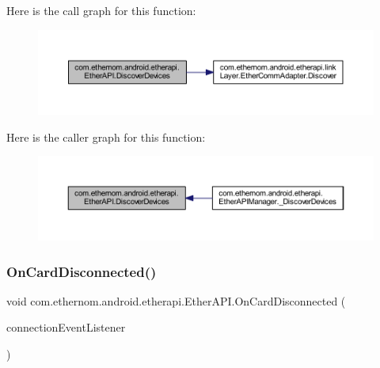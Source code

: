 Here is the call graph for this function\+:\nopagebreak
\begin{figure}[H]
\begin{center}
\leavevmode
\includegraphics[width=350pt]{classcom_1_1ethernom_1_1android_1_1etherapi_1_1_ether_a_p_i_af98bcd73ca505716754cfe967a1b65fd_cgraph}
\end{center}
\end{figure}
Here is the caller graph for this function\+:\nopagebreak
\begin{figure}[H]
\begin{center}
\leavevmode
\includegraphics[width=350pt]{classcom_1_1ethernom_1_1android_1_1etherapi_1_1_ether_a_p_i_af98bcd73ca505716754cfe967a1b65fd_icgraph}
\end{center}
\end{figure}
\mbox{\label{classcom_1_1ethernom_1_1android_1_1etherapi_1_1_ether_a_p_i_af4bf0cd04217e9ffc746a142deefd261}} 
\subsubsection{\texorpdfstring{On\+Card\+Disconnected()}{OnCardDisconnected()}}
{\footnotesize\ttfamily void com.\+ethernom.\+android.\+etherapi.\+Ether\+A\+P\+I.\+On\+Card\+Disconnected (\begin{DoxyParamCaption}\item[{final \mbox{\hyperlink{interfacecom_1_1ethernom_1_1android_1_1etherapi_1_1_connection_event_listener}{Connection\+Event\+Listener}}}]{connection\+Event\+Listener }\end{DoxyParamCaption})}



